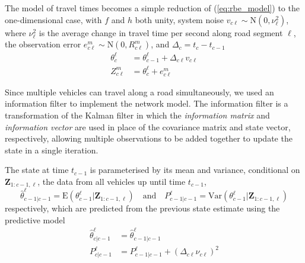 The model of travel times becomes a simple reduction of (\ref{eq:rbe_model}) 
to the one-dimensional case, 
with $f$ and $h$ both unity,
system noise $v_{c\ell} \sim \mathrm{N}(0, \nu_\ell^2)$,
where $\nu_\ell^2$ is the average change in travel time per second
along road segment $\ell$,
the observation error $e_{c\ell}^{m} \sim \mathrm{N}(0, R_{c\ell}^{m})$,
and $\Delta_c = t_c - t_{c-1}$
\begin{equation*}
\begin{split}
\theta_c^\ell &= \theta_{c-1}^\ell + \Delta_{c\ell} v_{c\ell} \\
Z_{c\ell}^{m} &= \theta_c^\ell + e_{c\ell}^{m}
\end{split}
\end{equation*}


Since multiple vehicles can travel along a road simultaneously,
we used an information filter to implement the network model.
The information filter is a transformation of the Kalman filter in which the
\emph{information matrix} and \emph{information vector} are used in place of 
the covariance matrix and state vector, respectively,
allowing multiple observations to be added together to update the state
in a single iteration.


The state at time $t_{c-1}$ is parameterised by its mean and variance,
conditional on $\boldsymbol{Z}_{1:c-1,\ell}$, 
the data from all vehicles up until time $t_{c-1}$,
\begin{equation*}
\hat \theta_{c-1|c-1}^\ell = 
\mathrm{E}(\theta_{c-1}^\ell | \boldsymbol{Z}_{1:c-1,\ell})
\quad\text{and}\quad
P_{c-1|c-1}^\ell = 
\mathrm{Var}(\theta_{c-1}^\ell | \boldsymbol{Z}_{1:c-1,\ell})
\end{equation*}
respectively,
which are predicted from the previous state estimate using the predictive model
\begin{align*}
\label{eq:kf_transition}
\hat \theta^\ell_{c|c-1} &= \hat \theta^\ell_{c-1|c-1} \\
P^\ell_{c|c-1} &= P^\ell_{c-1|c-1} + (\Delta_{c\ell} \nu_{c\ell})^2
\end{align*}

